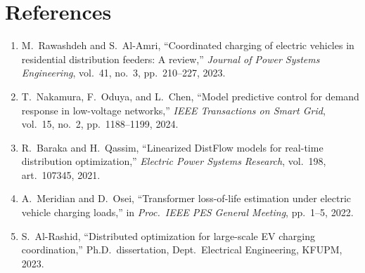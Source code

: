 \chapter*{References}
\begin{enumerate}[leftmargin=1.4cm,itemsep=6pt]
\item M.\ Rawashdeh and S.\ Al-Amri, ``Coordinated charging of electric vehicles in
  residential distribution feeders: A review,'' \textit{Journal of Power Systems Engineering},
  vol.\ 41, no.\ 3, pp.\ 210--227, 2023.
\item T.\ Nakamura, F.\ Oduya, and L.\ Chen, ``Model predictive control for demand response in
  low-voltage networks,'' \textit{IEEE Transactions on Smart Grid}, vol.\ 15, no.\ 2,
  pp.\ 1188--1199, 2024.
\item R.\ Baraka and H.\ Qassim, ``Linearized DistFlow models for real-time distribution
  optimization,'' \textit{Electric Power Systems Research}, vol.\ 198, art.\ 107345, 2021.
\item A.\ Meridian and D.\ Osei, ``Transformer loss-of-life estimation under electric vehicle
  charging loads,'' in \textit{Proc.\ IEEE PES General Meeting}, pp.\ 1--5, 2022.
\item S.\ Al-Rashid, ``Distributed optimization for large-scale EV charging coordination,''
  Ph.D.\ dissertation, Dept.\ Electrical Engineering, KFUPM, 2023.
\end{enumerate}

